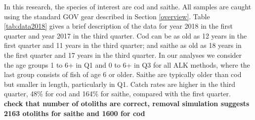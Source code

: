 \documentclass[a4paper 12pt]{article}
\numberwithin{equation}{section}
\begin{document}
In this research, the species of interest are cod and saithe. All samples are caught using the standard GOV gear described in Section \ref{overview}. Table \ref{tab:data2018} gives a brief description of the data for year 2018 in the first quarter and year 2017 in the third quarter.  Cod can be as old as 12 years in the first quarter and 11 years in the third quarter; and saithe as old as 18 years in the first quarter and 17 years in the third quarter. In our analyses we consider the age groups 1 to 6+ in Q1 and 0 to 6+ in Q3 for all ALK methods, where the last group consists of fish of age 6 or older. Saithe are typically older than cod but smaller in length, particularly in Q1. Catch rates are higher in the third quarter, 48\% for cod and 164\% for saithe, compared with the first quarter.\\

{\bf check that number of otoliths are correct, removal simulation suggests 2163 otoliths for saithe and 1600 for cod}
\end{document}
